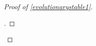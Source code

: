 \documentclass[11pt]{amsart}
\theoremstyle{definition}
\theoremstyle{remark}
\newenvironment{subproof}[1][\proofname]{%
  \renewcommand{\qedsymbol}{$\blacksquare$}%
  \begin{proof}[#1]%
}{%
  \end{proof}%
}
\begin{document}
\begin{proof}[Proof of \cref{evolutionarystable1}]
\begin{subproof}


\end{subproof}
\end{proof}
\end{document}
